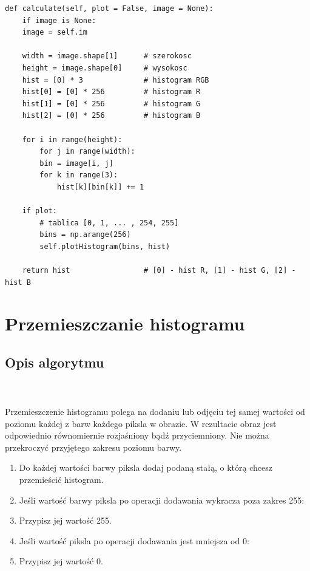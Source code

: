 \documentclass[final,a4paper,openany,12pt]{mwbk}
\begin{document}

\begin{lstlisting}[caption=Obliczanie histogramu]
def calculate(self, plot = False, image = None):
	if image is None:
	image = self.im
	
	width = image.shape[1]      # szerokosc
	height = image.shape[0]     # wysokosc
	hist = [0] * 3              # histogram RGB
	hist[0] = [0] * 256         # histogram R
	hist[1] = [0] * 256         # histogram G
	hist[2] = [0] * 256         # histogram B
	
	for i in range(height):
		for j in range(width):
		bin = image[i, j]
		for k in range(3):
			hist[k][bin[k]] += 1
	
	if plot:
		# tablica [0, 1, ... , 254, 255]
		bins = np.arange(256)
		self.plotHistogram(bins, hist)
	
	return hist                 # [0] - hist R, [1] - hist G, [2] - hist B
\end{lstlisting}

\pagebreak


\section{Przemieszczanie histogramu}
\subsection*{Opis algorytmu}
\hfill
\\\\
\indent Przemieszczenie histogramu polega na dodaniu lub odjęciu tej samej wartości od poziomu każdej z barw każdego piksla w obrazie.
W rezultacie obraz jest odpowiednio równomiernie rozjaśniony bądź przyciemniony.
Nie można przekroczyć przyjętego zakresu poziomu barwy.
\begin{enumerate}
	\item Do każdej wartości barwy piksla dodaj podaną stałą, o którą chcesz przemieścić histogram.
	\item Jeśli wartość barwy piksla po operacji dodawania wykracza poza zakres 255:
	\item Przypisz jej wartość 255.
	\item Jeśli wartość piksla po operacji dodawania jest mniejsza od 0:
	\item Przypisz jej wartość 0.
\end{enumerate}
\end{document}

